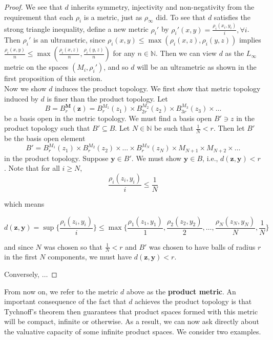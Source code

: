 \begin{proof}
We see that $d$ inherits symmetry, injectivity and non-negativity from the requirement that each $\rho_i$ is a metric, just as $\rho_\infty$ did.  To see that $d$  satisfies the strong triangle inequality, define a new metric $\rho_i'$ by $\rho_i'(x,y)=\frac{\rho_i(x_i,y_i)}{i}, \forall i$. Then  $\rho_i'$ is an ultrametric, since $\rho_i(x,y) \leq \max(\rho_i(x,z), \rho_i(y,z))$ implies  $\frac{\rho_i(x,y)}{n} \leq \max(\frac{\rho_i(x,z)}{n}, \frac{\rho_i(y,z)}{n})$ for any $n \in \mathbb{N}$. Then we can view $d$ as the $L_\infty$ metric on the spaces $(M_i, \rho_i')$, and so $d$ will be an ultrametric as shown in the first proposition of this section.\\

Now we show $d$ induces the product topology. We first show that metric topology induced by $d$ is finer than the product topology. Let \[B=B_r^{\textbf{M}}(\textbf{z}) =  B_r^{M_1}(z_1) \times B_{2r}^{M_2}(z_2)  \times B_{3r}^{M_3}(z_3) \times \ldots  \] be a basis open in the metric topology. We must find a basis open $B' \ni z$ in the product topology such that $B' \subseteq B$. Let $N \in \mathbb{N}$ be such that $\frac{1}{N} < r$. Then let $B'$ be the basis open element \[B' = B_r^{M_1}(z_1) \times B_r^{M_2}(z_2) \times \ldots \times B_r^{M_N}(z_N) \times M_{N+1} \times M_{N+2} \times \ldots \] in the product topology. Suppose $\textbf{y} \in B'$. We must show $\textbf{y} \in B$, i.e., $d(\textbf{z}, \textbf{y}) < r$. Note that for all $i \geq N$, 
\[\frac{\rho_i(z_i, y_i)}{i} \leq \frac{1}{N}\]

which means 

 \[d(\textbf{z},\textbf{y}) = \sup\{\frac{\rho_i(z_i,y_i)}{i}\} \leq \max\{\frac{\rho_1(z_1,y_1)}{1}, \frac{\rho_2(z_2,y_2)}{2}, \ldots, \frac{\rho_N(z_N,y_N)}{N}, \frac{1}{N}\}\]

and since $N$ was chosen so that $\frac{1}{N} < r$ and $B'$ was chosen to have balls of radius $r$ in the first $N$ components, we must have $d(\textbf{z}, \textbf{y}) < r$.

Conversely, $\ldots$
\end{proof}

From now on, we refer to the metric $d$ above as the \textbf{product metric}. An important consequence of the fact that $d$ achieves the product topology is that Tychnoff's theorem then guarantees that product spaces formed with this metric will be compact, infinite or otherwise. As a result, we can now ask directly about the valuative capacity of some infinite product spaces. We consider two examples. 

